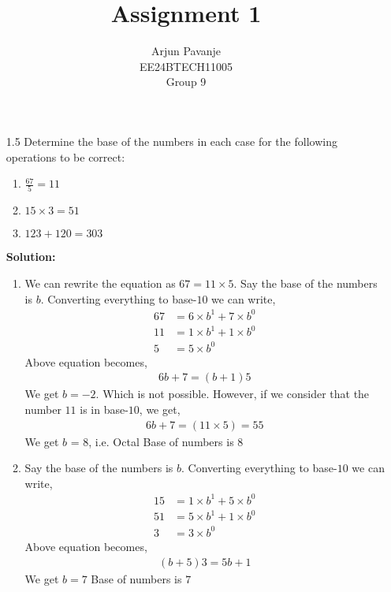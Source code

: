 \documentclass[a4paper,12pt]{article}
\title{Assignment 1}
\author{Arjun Pavanje\\EE24BTECH11005\\Group 9}
\begin{document}
\maketitle
\begin{enumerate}
    \item[1.5] Determine the base of the numbers in each case for the following operations to be correct:
\begin{enumerate}
  \item $\frac{67}{5} = 11$ \\
  \item $15 \times 3 = 51$\\
  \item $123 + 120 = 303$
\end{enumerate} 
\textbf{Solution:}\newline
\begin{enumerate}
  \item We can rewrite the equation as $67 = 11 \times 5$. Say the base of the numbers is $b$. Converting everything to base-$10$ we can write,
    \begin{align*}
      67 &= 6 \times b^1 + 7 \times b^0 \\
      11 &= 1 \times b^1 + 1\times b^0\\
      5 &= 5 \times b^0
    \end{align*}
  Above equation becomes,
    \begin{align*}
      6b + 7 = (b + 1)5
    \end{align*}
    We get $b = -2$. Which is not possible. However, if we consider that the number $11$ is in base-$10$, we get,
    \begin{align*}
      6b + 7 = (11\times5) = 55
    \end{align*}
    We get $b$ = 8, i.e. Octal\newline
    Base of numbers is $8$
  \item Say the base of the numbers is $b$. Converting everything to base-$10$ we can write,
    \begin{align*}
      15 &= 1 \times b^1 + 5 \times b^0 \\
      51 &= 5 \times b^1 + 1\times b^0\\
      3 &= 3 \times b^0
    \end{align*}
  Above equation becomes,
    \begin{align*}
      (b + 5)3 = 5b + 1
    \end{align*}
    We get $b = 7$\newline
    Base of numbers is $7$

\end{enumerate}
\end{enumerate}
\end{document}

